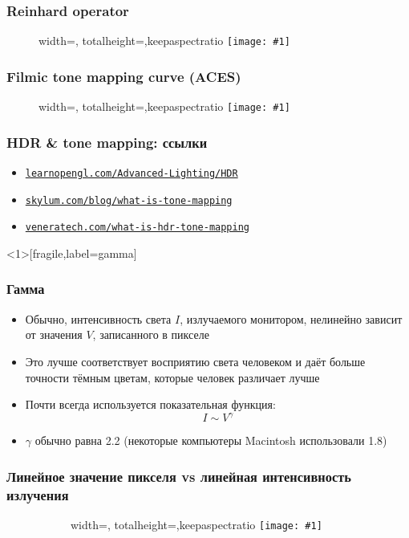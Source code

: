 \documentclass{beamer}
\newcommand{\slideimage}[1]{
  \begin{figure}
    \begin{adjustbox}{width=\textwidth, totalheight=\textheight-2\baselineskip-2\baselineskip,keepaspectratio}
      \texttt{[image: \#1]}
    \end{adjustbox}
  \end{figure}
}
\begin{document}
\begin{frame}[fragile]
\frametitle{Reinhard operator}
\slideimage{reinhard.png}
\end{frame}

\begin{frame}[fragile]
\frametitle{Filmic tone mapping curve (ACES)}
\slideimage{aces.png}
\end{frame}

\begin{frame}[fragile]
\frametitle{HDR \& tone mapping: ссылки}
\begin{itemize}
\item \href{https://learnopengl.com/Advanced-Lighting/HDR}{\nolinkurl{learnopengl.com/Advanced-Lighting/HDR}}
\item \href{https://skylum.com/blog/what-is-tone-mapping}{\nolinkurl{skylum.com/blog/what-is-tone-mapping}}
\item \href{https://www.veneratech.com/what-is-hdr-tone-mapping}{\nolinkurl{veneratech.com/what-is-hdr-tone-mapping}}
\end{itemize}
\end{frame}

\begin{frame}<1>[fragile,label=gamma]
\frametitle{Гамма}
\begin{itemize}
\item Обычно, интенсивность света \begin{math}I\end{math}, излучаемого монитором, нелинейно зависит от значения \begin{math}V\end{math}, записанного в пикселе
\pause
\item Это лучше соответствует восприятию света человеком и даёт больше точности тёмным цветам, которые человек различает лучше
\pause
\item Почти всегда используется показательная функция:
\begin{equation}I \sim V^\gamma\end{equation}
\pause
\item \begin{math}\gamma\end{math} обычно равна 2.2 (некоторые компьютеры Macintosh использовали 1.8)
\end{itemize}
\end{frame}

\begin{frame}
\frametitle{Линейное значение пикселя vs линейная интенсивность излучения}
\begin{figure}
\slideimage{gamma-scale.png}
\end{figure}
\end{frame}
\end{document}
